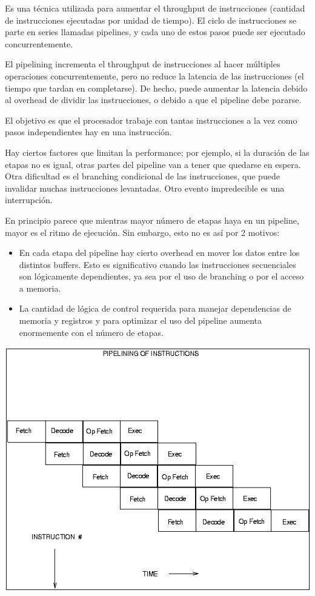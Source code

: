 Es una t\'ecnica utilizada para aumentar el throughput de instrucciones (cantidad de instrucciones ejecutadas por unidad de tiempo). El ciclo
de instrucciones se parte en series llamadas pipelines, y cada uno de estos pasos puede ser ejecutado concurrentemente.

El pipelining incrementa el throughput de instrucciones al hacer m\'ultiples operaciones concurrentemente, pero no reduce la latencia de las instrucciones
(el tiempo que tardan en completarse). De hecho, puede aumentar la latencia debido al overhead de dividir las instrucciones, o debido a que el pipeline
debe pararse.

El objetivo es que el procesador trabaje con tantas instrucciones a la vez como pasos independientes hay en una instrucci\'on.

Hay ciertos factores que limitan la performance; por ejemplo, si la duraci\'on de las etapas no es igual, otras partes del pipeline van a 
tener que quedarse en espera. Otra dificultad es el branching condicional de las instrucciones, que puede invalidar muchas instrucciones
levantadas. Otro evento impredecible es una interrupci\'on.

En principio parece que mientras mayor n\'umero de etapas haya en un pipeline, mayor es el ritmo de ejecuci\'on. Sin embargo, esto no es as\'i por
2 motivos:

\begin{itemize}
 \item En cada etapa del pipeline hay cierto overhead en mover los datos entre los distintos buffers. Esto es significativo cuando las instrucciones
 secuenciales son l\'ogicamente dependientes, ya sea por el uso de branching o por el acceso a memoria.
 \item La cantidad de l\'ogica de control requerida para manejar dependencias de memoria y registros y para optimizar el uso del pipeline aumenta
 enormemente con el n\'umero de etapas.
\end{itemize}


\begin{center}
\includegraphics[scale=0.4]{./Graficos/pipeline.png} 
\end{center}



